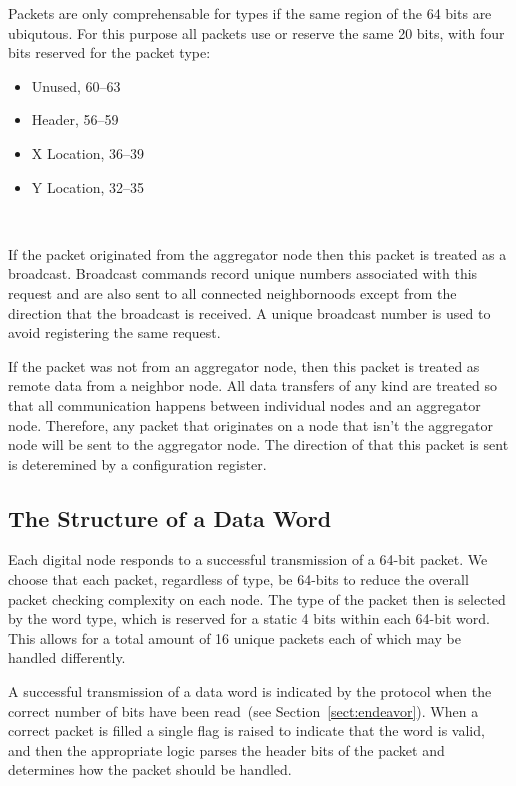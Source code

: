 Packets are only comprehensable for types if the same region of the 64 bits are ubiqutous.
For this purpose all packets use or reserve the same 20 bits, with four bits reserved for the packet type:

\begin{itemize}
    \item Unused, 60--63
    \item Header, 56--59
    \item X Location, 36--39
    \item Y Location, 32--35
\end{itemize}~\label{bit_reservation}

If the packet originated from the aggregator node then this packet is treated as a broadcast.
Broadcast commands record unique numbers associated with this request and are also sent to all connected neighbornoods except from the direction that the broadcast is received.
A unique broadcast number is used to avoid registering the same request.

If the packet was not from an aggregator node, then this packet is treated as remote data from a neighbor node.
All data transfers of any kind are treated so that all communication happens between individual nodes and an aggregator node.
Therefore, any packet that originates on a node that isn't the aggregator node will be sent to the aggregator node.
The direction of that this packet is sent is deteremined by a configuration register.

\subsection{The Structure of a Data Word}

Each digital node responds to a successful transmission of a 64-bit packet.
We choose that each packet, regardless of type, be 64-bits to reduce the overall packet checking complexity on each node.
The type of the packet then is selected by the word type, which is reserved for a static 4 bits within each 64-bit word.
This allows for a total amount of 16 unique packets each of which may be handled differently.

A successful transmission of a data word is indicated by the protocol when the correct number of bits have been read~(see Section~\ref{sect:endeavor}).
When a correct packet is filled a single flag is raised to indicate that the word is valid, and then the appropriate logic parses the header bits of the packet and determines how the packet should be handled.


